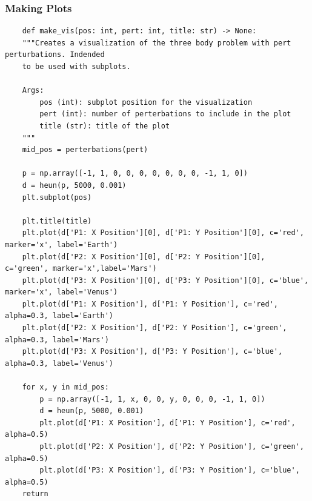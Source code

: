 \documentclass{article}
\begin{document}
\subsubsection{Making Plots}
\begin{verbatim}
    def make_vis(pos: int, pert: int, title: str) -> None:
    """Creates a visualization of the three body problem with pert perturbations. Indended 
    to be used with subplots.

    Args:
        pos (int): subplot position for the visualization
        pert (int): number of perterbations to include in the plot
        title (str): title of the plot
    """
    mid_pos = perterbations(pert)

    p = np.array([-1, 1, 0, 0, 0, 0, 0, 0, 0, -1, 1, 0])
    d = heun(p, 5000, 0.001)
    plt.subplot(pos)

    plt.title(title)
    plt.plot(d['P1: X Position'][0], d['P1: Y Position'][0], c='red', marker='x', label='Earth')
    plt.plot(d['P2: X Position'][0], d['P2: Y Position'][0], c='green', marker='x',label='Mars')
    plt.plot(d['P3: X Position'][0], d['P3: Y Position'][0], c='blue', marker='x', label='Venus')
    plt.plot(d['P1: X Position'], d['P1: Y Position'], c='red', alpha=0.3, label='Earth')
    plt.plot(d['P2: X Position'], d['P2: Y Position'], c='green', alpha=0.3, label='Mars')
    plt.plot(d['P3: X Position'], d['P3: Y Position'], c='blue', alpha=0.3, label='Venus')

    for x, y in mid_pos:
        p = np.array([-1, 1, x, 0, 0, y, 0, 0, 0, -1, 1, 0])
        d = heun(p, 5000, 0.001)        
        plt.plot(d['P1: X Position'], d['P1: Y Position'], c='red', alpha=0.5)
        plt.plot(d['P2: X Position'], d['P2: Y Position'], c='green', alpha=0.5)
        plt.plot(d['P3: X Position'], d['P3: Y Position'], c='blue', alpha=0.5)
    return
\end{verbatim}
\end{document}
